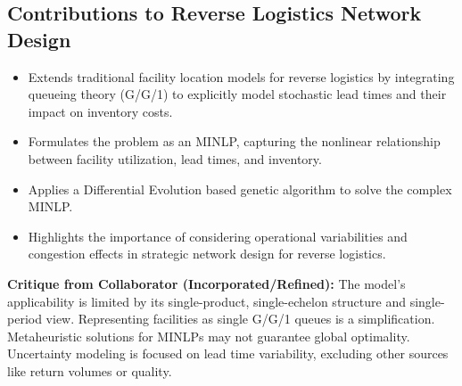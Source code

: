 \subsection*{Contributions to Reverse Logistics Network Design}
\begin{itemize}
    \item Extends traditional facility location models for reverse logistics by integrating queueing theory (G/G/1) to explicitly model stochastic lead times and their impact on inventory costs.
    \item Formulates the problem as an MINLP, capturing the nonlinear relationship between facility utilization, lead times, and inventory.
    \item Applies a Differential Evolution based genetic algorithm to solve the complex MINLP.
    \item Highlights the importance of considering operational variabilities and congestion effects in strategic network design for reverse logistics.
\end{itemize}
\textbf{Critique from Collaborator (Incorporated/Refined):} The model's applicability is limited by its single-product, single-echelon structure and single-period view. Representing facilities as single G/G/1 queues is a simplification. Metaheuristic solutions for MINLPs may not guarantee global optimality. Uncertainty modeling is focused on lead time variability, excluding other sources like return volumes or quality.